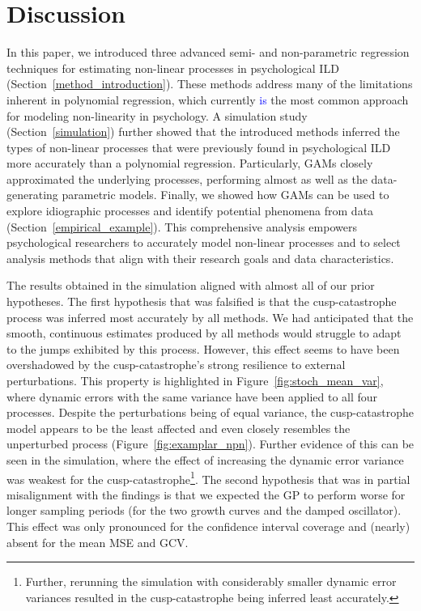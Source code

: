 \documentclass[man, floatsintext]{apa7}
\begin{document}
\section{Discussion}

In this paper, we introduced three advanced semi- and non-parametric regression
techniques for estimating non-linear processes in psychological ILD
(Section~\ref{method_introduction}). These methods address many of the
limitations inherent in polynomial regression, which currently
\textcolor{blue}{is} the most common approach for modeling non-linearity in
psychology. A simulation study (Section~\ref{simulation}) further showed that
the introduced methods inferred the types of non-linear processes that were
previously found in psychological ILD more accurately than a polynomial
regression. Particularly, GAMs closely approximated the underlying processes,
performing almost as well as the data-generating parametric models. Finally, we
showed how GAMs can be used to explore idiographic processes and identify
potential phenomena from data (Section~\ref{empirical_example}). This
comprehensive analysis empowers psychological researchers to accurately model
non-linear processes and to select analysis methods that align with their
research goals and data characteristics.

The results obtained in the simulation aligned with almost all of our prior
hypotheses. The first hypothesis that was falsified is that the
cusp-catastrophe process was inferred most accurately by all methods. We had
anticipated that the smooth, continuous estimates produced by all methods would
struggle to adapt to the jumps exhibited by this process. However, this effect
seems to have been overshadowed by the cusp-catastrophe's strong resilience to
external perturbations. This property is highlighted in
Figure~\ref{fig:stoch_mean_var}, where dynamic errors with the
same variance have
been applied to all four processes. Despite the perturbations being of equal
variance, the cusp-catastrophe model appears to be the least affected and even
closely resembles the unperturbed process (Figure~\ref{fig:examplar_npn}).
Further evidence of this can be seen in the simulation, where the effect of
increasing the dynamic error variance was weakest for the
cusp-catastrophe\footnote{Further, rerunning the simulation with considerably
  smaller dynamic error variances resulted in the cusp-catastrophe being
  inferred
  least accurately.}. The second hypothesis that was in partial misalignment
with
the findings is that we expected the GP to perform worse for longer sampling
periods (for the two growth curves and the damped oscillator). This effect was
only pronounced for the confidence interval coverage and (nearly) absent for
the mean MSE and GCV\@.
\end{document}
